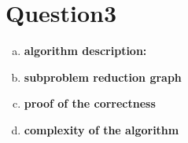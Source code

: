 \section{Question3}
\begin{enumerate}[a).]
\item  \textbf{algorithm description:}



\item  \textbf{subproblem reduction graph}
	
\item \textbf{proof of the correctness}	


\item \textbf{complexity of the algorithm}	
\end{enumerate}

	